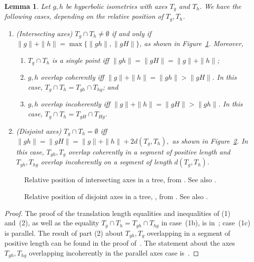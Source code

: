 \documentclass[11pt]{amsart}
\newcommand*{\svgfignormal}[1]{\fontsize{9pt}{9pt}\selectfont}
\numberwithin{equation}{section}
\numberwithin{figure}{section}
\newtheorem{lemma}[theorem]{Lemma}
\theoremstyle{definition}
\theoremstyle{plain}
\begin{document}
\begin{lemma}
Let $g,h$ be hyperbolic isometries with axes $T_g$ and $T_h$.
We have the following cases, depending on the relative position of $T_g,T_h$.
\begin{enumerate}[(\arabic*)]
\item \label{item:tree-intersect}(Intersecting axes)
$T_g \cap T_h \neq \emptyset$ if and only if $\| g \| + \| h \| =\max \{ \| gh \| , \|gH\| \}$, as shown in Figure~\ref{fig:trees_intersection}.
Moreover,
\begin{enumerate}
\item $T_g \cap T_h$ is a single point iff $\|gh\| = \| gH\| = \|  g \| + \|h \|$;
\item $g,h$ overlap coherently iff 
$\| g \| + \| h \| = \| gh \| >\|gH\|$. In this case, $T_g \cap
T_h = T_{gh} \cap T_{hg}$; and
\item $g,h$ overlap incoherently iff 
$\| g \| + \| h \| = \| gH \| >\|gh\|$. In this case, $T_g \cap T_h = T_{gH} \cap T_{Hg}$.
\end{enumerate}
\item \label{item:tree-disjoint}(Disjoint axes) $T_g \cap T_h =\emptyset$ iff
$\|gh\| = \| gH\| = \|  g \| + \|h \| + 2d(T_g,T_h),$
as shown in Figure~\ref{fig:trees_disjoint}.
In this case, $T_{gh}, T_g$ overlap coherently
in a segment of positive length and
$T_{gh},T_{hg}$ overlap incoherently on a segment of length
$d(T_g, T_h)$.
\end{enumerate}
\label{lem:foundation_trees}
\end{lemma}

\begin{figure}[ht]
     \centering
\resizebox{80mm}{!}{\svgfignormal{trees_intersection}}
    \caption{Relative position of intersecting axes in a tree, from
      \cite[Fig.\ 3]{Pa89:Paulin1989TheGT}. See also \cite{CM87:GroupActions}.}
    \label{fig:trees_intersection}
\end{figure}
\begin{figure}[ht]
     \centering
\resizebox{80mm}{!}{\svgfignormal{trees_disjoint}}
    \caption{Relative position of disjoint axes in a tree, , from
      \cite[Fig.\ 2]{Pa89:Paulin1989TheGT}. See also \cite{CM87:GroupActions}.}\label{fig:trees_disjoint}
\end{figure}


\begin{proof}
The proof of the translation length equalities and inequalities of (1)
and~(2),
as well as the equality $T_g \cap T_h = T_{gh} \cap T_{hg}$
in case~(1b), is in~\cite[Sections~1.5, 1.8]{CM87:GroupActions};
case~(1c) is parallel.
The result of part (2) about $T_{gh}, T_g$ overlapping in a segment of positive length can be found in the proof of~\cite[Theorem~2.7]{CM87:GroupActions}.
The statement about the axes $T_{gh},T_{hg}$ overlapping incoherently in the parallel axes case is~\cite[Remark~3.5]{CM87:GroupActions}.
\end{proof}
\end{document}
